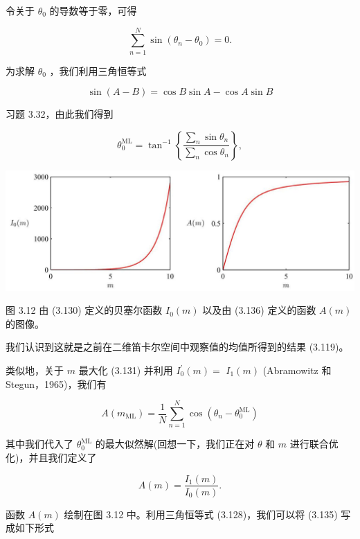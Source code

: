 \documentclass[10pt]{article}
\begin{document}
令关于 \({\theta }_{0}\) 的导数等于零，可得

\[
\mathop{\sum }\limits_{{n = 1}}^{N}\sin \left( {{\theta }_{n} - {\theta }_{0}}\right)  = 0. \tag{3.132}
\]

为求解 \({\theta }_{0}\) ，我们利用三角恒等式

\[
\sin \left( {A - B}\right)  = \cos B\sin A - \cos A\sin B \tag{3.133}
\]

习题 3.32，由此我们得到

\[
{\theta }_{0}^{\mathrm{{ML}}} = {\tan }^{-1}\left\{  \frac{\mathop{\sum }\limits_{n}\sin {\theta }_{n}}{\mathop{\sum }\limits_{n}\cos {\theta }_{n}}\right\}  , \tag{3.134}
\]

\begin{center}
\includegraphics[max width=1.0\textwidth]{images/0194e279-9b28-703a-88f4-c3ac21e2010d_112_216_360_1302_449_0.jpg}
\end{center}
\hspace*{3em} 

图 3.12 由 (3.130) 定义的贝塞尔函数 \({I}_{0}\left( m\right)\) 以及由 (3.136) 定义的函数 \(A\left( m\right)\) 的图像。

我们认识到这就是之前在二维笛卡尔空间中观察值的均值所得到的结果 (3.119)。

类似地，关于 \(m\) 最大化 (3.131) 并利用 \({I}_{0}^{\prime }\left( m\right)  =\)  \({I}_{1}\left( m\right)\) (Abramowitz 和 Stegun，1965)，我们有

\[
A\left( {m}_{\mathrm{{ML}}}\right)  = \frac{1}{N}\mathop{\sum }\limits_{{n = 1}}^{N}\cos \left( {{\theta }_{n} - {\theta }_{0}^{\mathrm{{ML}}}}\right)  \tag{3.135}
\]

其中我们代入了 \({\theta }_{0}^{\mathrm{{ML}}}\) 的最大似然解(回想一下，我们正在对 \(\theta\) 和 \(m\) 进行联合优化)，并且我们定义了

\[
A\left( m\right)  = \frac{{I}_{1}\left( m\right) }{{I}_{0}\left( m\right) }. \tag{3.136}
\]

函数 \(A\left( m\right)\) 绘制在图 3.12 中。利用三角恒等式 (3.128)，我们可以将 (3.135) 写成如下形式
\end{document}
